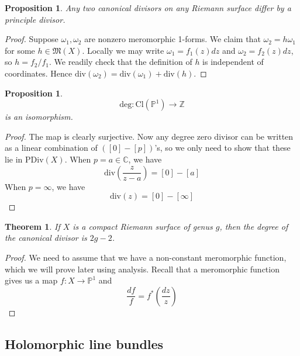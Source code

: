 \documentclass[12pt]{article}
\theoremstyle{plain}
\newtheorem{theorem}[equation]{Theorem}
\newtheorem{proposition}[equation]{Proposition}
\theoremstyle{definition}
\newcommand{\fM}{\mathfrak{M}}
\newcommand{\IC}{\mathbb{C}}
\newcommand{\IP}{\mathbb{P}}
\newcommand{\IZ}{\mathbb{Z}}
\renewcommand{\deg}{\mathrm{deg}}
\newcommand{\<}{\langle}
\renewcommand{\>}{\rangle}
\newcommand{\w}{\omega}
\newcommand{\PDiv}{\mathrm{PDiv}}
\renewcommand{\div}{\mathrm{div}}
\newcommand{\Cl}{\mathrm{Cl}}
\begin{document}
\begin{proposition}
Any two canonical divisors on any Riemann surface differ by a principle divisor.  
\end{proposition}
\begin{proof}
Suppose $\w_1, \w_2$ are nonzero meromorphic 1-forms. We claim that $\w_2 = h \w_1$ for some $h \in \fM(X)$. Locally we may write $\w_1 = f_1(z) dz$ and $\w_2 = f_2(z) dz$, so $h = f_2/f_1$. We readily check that the definition of $h$ is independent of coordinates. Hence $\div(\w_2) = \div(\w_1) + \div(h)$. 
\end{proof}


\begin{proposition}
$$\deg : \Cl(\IP^1) \to \IZ$$ is an isomorphism. 
\end{proposition}
\begin{proof}
The map is clearly surjective. Now any degree zero divisor can be written as a linear combination of $([0] - [p])$'s, so we only need to show that these lie in $\PDiv(X)$. When $p = a \in \IC$, we have 
$$ \div(\frac{z}{z - a}) = [0] - [a] $$
When $p = \infty$, we have 
$$ \div(z) = [0] - [\infty] $$  
\end{proof}

\begin{theorem}
If $X$ is a compact Riemann surface of genus $g$, then the degree of the canonical divisor is $2g - 2$. 
\end{theorem}
\begin{proof}
We need to assume that we have a non-constant meromorphic function, which we will prove later using analysis. Recall that a meromorphic function gives us a map $f : X \to \IP^1$ and 
$$ \frac{df}{f} = f^*(\frac{dz}{z}) $$
\end{proof}



\subsection{Holomorphic line bundles}
\end{document}
